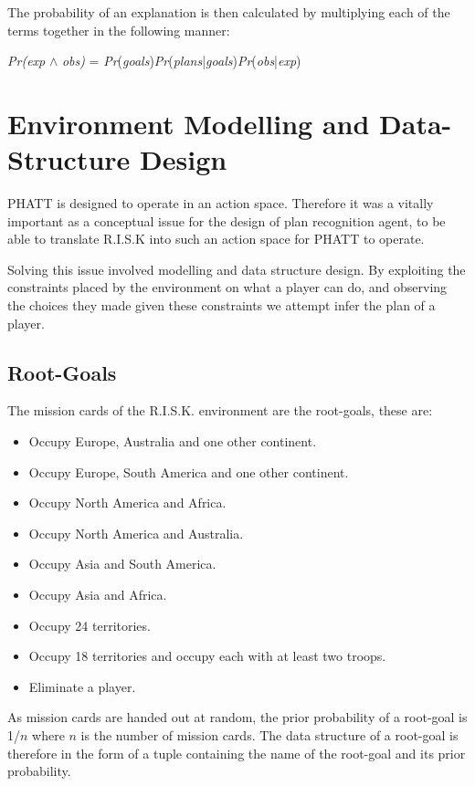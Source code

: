 \documentclass[parskip]{cs4rep}
\begin{document}
The probability of an explanation is then calculated by multiplying each of the terms together in the following manner: \newline

\centerline{
\textit{Pr(exp} $\wedge$ \textit{obs)} = \textit{Pr}(\textit{goals})\textit{Pr}(\textit{plans}|\textit{goals})\textit{Pr}(\textit{obs}|\textit{exp})
}

\section{Environment Modelling and Data-Structure Design}

PHATT is designed to operate in an action space. Therefore it was a vitally important as a conceptual issue for the design of plan recognition agent, to be able to translate R.I.S.K into such an action space for PHATT to operate.

Solving this issue involved modelling and data structure design. By exploiting the constraints placed by the environment on what a player can do, and observing the choices they made given these constraints we attempt infer the plan of a player.

\subsection{Root-Goals}

The mission cards of the R.I.S.K. environment are the root-goals, these are:

\begin{itemize}
\item
Occupy Europe, Australia and one other continent.
\item
Occupy Europe, South America and one other continent.
\item
Occupy North America and Africa.
\item
Occupy North America and Australia.
\item
Occupy Asia and South America.
\item
Occupy Asia and Africa.
\item
Occupy 24 territories.
\item
Occupy 18 territories and occupy each with at least two troops.
\item
Eliminate a player.
\end{itemize}

As mission cards are handed out at random, the prior probability of a root-goal is 1/$n$ where $n$ is the number of mission cards. The data structure of a root-goal is therefore in the form of a tuple containing the name of the root-goal and its prior probability.
\end{document}
